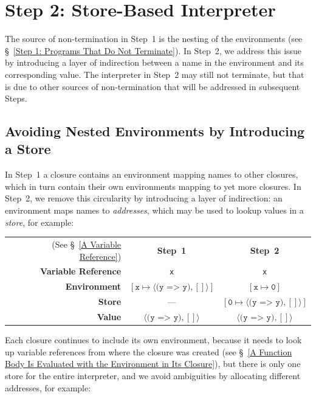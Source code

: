 \documentclass[12pt, oneside]{book}
\begin{document}
\section{Step 2: Store-Based Interpreter}

The source of non-termination in Step~1 is the nesting of the environments (see §~\ref{Step 1: Programs That Do Not Terminate}). In Step~2, we address this issue by introducing a layer of indirection between a name in the environment and its corresponding value. The interpreter in Step~2 may still not terminate, but that is due to other sources of non-termination that will be addressed in subsequent Steps.

\subsection{Avoiding Nested Environments by Introducing a Store}

In Step~1 a closure contains an environment mapping names to other closures, which in turn contain their own environments mapping to yet more closures. In Step~2, we remove this circularity by introducing a layer of indirection: an environment maps names to \emph{addresses}, which may be used to lookup values in a \emph{store}, for example:

\begin{center}
\begin{tabular}{rcc}
(See §~\ref{A Variable Reference}) & \textbf{Step~1} & \textbf{Step~2} \\
\textbf{Variable Reference} & \texttt{x} & \texttt{x} \\
\textbf{Environment} & $[\texttt{x} \mapsto \langle \texttt{(y => y)}, [] \rangle]$ & $[\texttt{x} \mapsto \texttt{0}]$ \\
\textbf{Store} & — & $[\texttt{0} \mapsto \langle \texttt{(y => y)}, [] \rangle]$ \\
\textbf{Value} & $\langle \texttt{(y => y)}, [] \rangle$ & $\langle \texttt{(y => y)}, [] \rangle$ \\
\end{tabular}
\end{center}

Each closure continues to include its own environment, because it needs to look up variable references from where the closure was created (see §~\ref{A Function Body Is Evaluated with the Environment in Its Closure}), but there is only one store for the entire interpreter, and we avoid ambiguities by allocating different addresses, for example:
\end{document}
